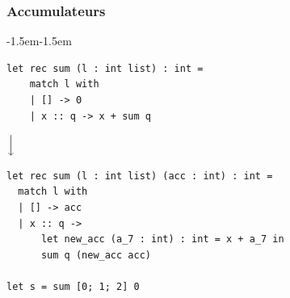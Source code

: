 \begin{frame}[fragile]
    \frametitle{Accumulateurs}

    \begin{adjustwidth}{-1.5em}{-1.5em}

        \small \begin{verbatim}
let rec sum (l : int list) : int =
    match l with
    | [] -> 0
    | x :: q -> x + sum q
        \end{verbatim}

        \vspace{0.2cm}
        \begin{center}
            $\Big\downarrow$
        \end{center}
        \vspace{0.2cm}

        \small \begin{verbatim}
let rec sum (l : int list) (acc : int) : int =
  match l with
  | [] -> acc
  | x :: q ->
      let new_acc (a_7 : int) : int = x + a_7 in
      sum q (new_acc acc)

let s = sum [0; 1; 2] 0
        \end{verbatim}

    \end{adjustwidth}
\end{frame}